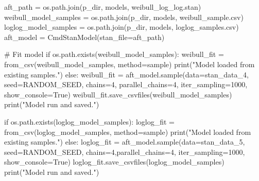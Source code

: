 \documentclass[
  letterpaper,
  DIV=11,
  numbers=noendperiod]{scrartcl}
\newenvironment{Shaded}{\begin{snugshade}}{\end{snugshade}}
\newcommand{\BuiltInTok}[1]{\textcolor[rgb]{0.00,0.23,0.31}{#1}}
\newcommand{\CommentTok}[1]{\textcolor[rgb]{0.37,0.37,0.37}{#1}}
\newcommand{\ControlFlowTok}[1]{\textcolor[rgb]{0.00,0.23,0.31}{#1}}
\newcommand{\DecValTok}[1]{\textcolor[rgb]{0.68,0.00,0.00}{#1}}
\newcommand{\NormalTok}[1]{\textcolor[rgb]{0.00,0.23,0.31}{#1}}
\newcommand{\OperatorTok}[1]{\textcolor[rgb]{0.37,0.37,0.37}{#1}}
\newcommand{\StringTok}[1]{\textcolor[rgb]{0.13,0.47,0.30}{#1}}
\newcommand{\VariableTok}[1]{\textcolor[rgb]{0.07,0.07,0.07}{#1}}
\begin{document}
\begin{Shaded}
\begin{Highlighting}[]
\NormalTok{aft\_path }\OperatorTok{=}\NormalTok{ os.path.join(p\_dir, }\StringTok{\textquotesingle{}models\textquotesingle{}}\NormalTok{, }\StringTok{\textquotesingle{}weibull\_log\_log.stan\textquotesingle{}}\NormalTok{)}
\NormalTok{weibull\_model\_samples }\OperatorTok{=}\NormalTok{ os.path.join(p\_dir, }\StringTok{\textquotesingle{}models\textquotesingle{}}\NormalTok{, }\StringTok{\textquotesingle{}weibull\_sample.csv\textquotesingle{}}\NormalTok{)}
\NormalTok{loglog\_model\_samples }\OperatorTok{=}\NormalTok{ os.path.join(p\_dir, }\StringTok{\textquotesingle{}models\textquotesingle{}}\NormalTok{, }\StringTok{\textquotesingle{}loglog\_samples.csv\textquotesingle{}}\NormalTok{)}
\NormalTok{aft\_model }\OperatorTok{=}\NormalTok{ CmdStanModel(stan\_file}\OperatorTok{=}\NormalTok{aft\_path)}
\end{Highlighting}
\end{Shaded}

\begin{Shaded}
\begin{Highlighting}[]
\CommentTok{\# Fit model}
\ControlFlowTok{if}\NormalTok{ os.path.exists(weibull\_model\_samples): }
\NormalTok{    weibull\_fit }\OperatorTok{=}\NormalTok{ from\_csv(weibull\_model\_samples, method}\OperatorTok{=}\StringTok{\textquotesingle{}sample\textquotesingle{}}\NormalTok{)}
    \BuiltInTok{print}\NormalTok{(}\StringTok{"Model loaded from existing samples."}\NormalTok{)}
\ControlFlowTok{else}\NormalTok{:}
\NormalTok{    weibull\_fit }\OperatorTok{=}\NormalTok{ aft\_model.sample(data}\OperatorTok{=}\NormalTok{stan\_data\_4, seed}\OperatorTok{=}\NormalTok{RANDOM\_SEED, chains}\OperatorTok{=}\DecValTok{4}\NormalTok{, parallel\_chains}\OperatorTok{=}\DecValTok{4}\NormalTok{, iter\_sampling}\OperatorTok{=}\DecValTok{1000}\NormalTok{, show\_console}\OperatorTok{=}\VariableTok{True}\NormalTok{)}
\NormalTok{    weibull\_fit.save\_csvfiles(weibull\_model\_samples)}
    \BuiltInTok{print}\NormalTok{(}\StringTok{"Model run and saved."}\NormalTok{)}

\ControlFlowTok{if}\NormalTok{ os.path.exists(loglog\_model\_samples):}
\NormalTok{    loglog\_fit }\OperatorTok{=}\NormalTok{ from\_csv(loglog\_model\_samples, method}\OperatorTok{=}\StringTok{\textquotesingle{}sample\textquotesingle{}}\NormalTok{)}
    \BuiltInTok{print}\NormalTok{(}\StringTok{"Model loaded from existing samples."}\NormalTok{)}
\ControlFlowTok{else}\NormalTok{:}
\NormalTok{    loglog\_fit }\OperatorTok{=}\NormalTok{ aft\_model.sample(data}\OperatorTok{=}\NormalTok{stan\_data\_5, seed}\OperatorTok{=}\NormalTok{RANDOM\_SEED, chains}\OperatorTok{=}\DecValTok{4}\NormalTok{,parallel\_chains}\OperatorTok{=}\DecValTok{4}\NormalTok{, iter\_sampling}\OperatorTok{=}\DecValTok{1000}\NormalTok{, show\_console}\OperatorTok{=}\VariableTok{True}\NormalTok{)}
\NormalTok{    loglog\_fit.save\_csvfiles(loglog\_model\_samples)}
    \BuiltInTok{print}\NormalTok{(}\StringTok{"Model run and saved."}\NormalTok{)}
\end{Highlighting}
\end{Shaded}
\end{document}
